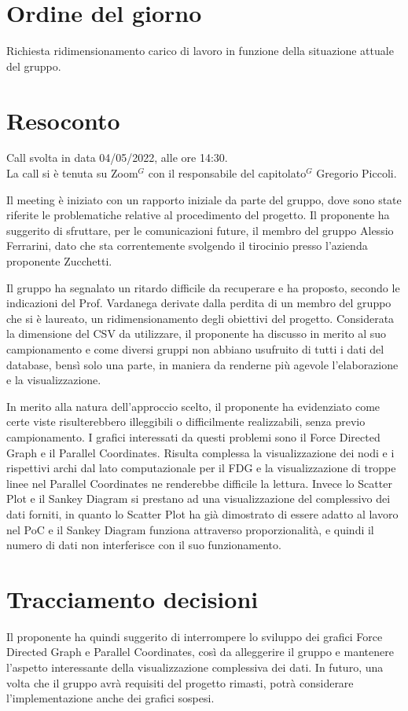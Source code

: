 \section{Ordine del giorno}
Richiesta ridimensionamento carico di lavoro in funzione della situazione attuale del gruppo.

\section{Resoconto}
\noindent 
Call svolta in data 04/05/2022, alle ore 14:30. \\
\noindent La call si è tenuta su Zoom$^{G}$ con il responsabile del capitolato$^{G}$ Gregorio Piccoli. 

Il meeting è iniziato con un rapporto iniziale da parte del gruppo, dove sono state riferite le problematiche relative al procedimento del progetto. Il proponente ha suggerito di sfruttare, per le comunicazioni future, il membro del gruppo Alessio Ferrarini, dato che sta correntemente svolgendo il tirocinio presso l'azienda proponente Zucchetti.

Il gruppo ha segnalato un ritardo difficile da recuperare e ha proposto, secondo le indicazioni del Prof. Vardanega derivate dalla perdita di un membro del gruppo che si è laureato, un ridimensionamento degli obiettivi del progetto. Considerata la dimensione del CSV da utilizzare, il proponente ha discusso in merito al suo campionamento e come diversi gruppi non abbiano usufruito di tutti i dati del database, bensì solo una parte, in maniera da renderne più agevole l'elaborazione e la visualizzazione.

In merito alla natura dell'approccio scelto, il proponente ha evidenziato come certe viste risulterebbero illeggibili o difficilmente realizzabili, senza previo campionamento. I grafici interessati da questi problemi sono il Force Directed Graph e il Parallel Coordinates. Risulta complessa la visualizzazione dei nodi e i rispettivi archi dal lato computazionale per il FDG e la visualizzazione di troppe linee nel Parallel Coordinates ne renderebbe difficile la lettura. Invece lo Scatter Plot e il Sankey Diagram si prestano ad una visualizzazione del complessivo dei dati forniti, in quanto lo Scatter Plot ha già dimostrato di essere adatto al lavoro nel PoC e il Sankey Diagram funziona attraverso proporzionalità, e quindi il numero di dati non interferisce con il suo funzionamento.


\section{Tracciamento decisioni}
Il proponente ha quindi suggerito di interrompere lo sviluppo dei grafici Force Directed Graph e Parallel Coordinates, così da alleggerire il gruppo e mantenere l'aspetto interessante della visualizzazione complessiva dei dati. In futuro, una volta che il gruppo avrà requisiti del progetto rimasti, potrà considerare l'implementazione anche  dei grafici sospesi.

\vspace{1.8em}
\vspace{1.8em}
\vspace{1.8em}
